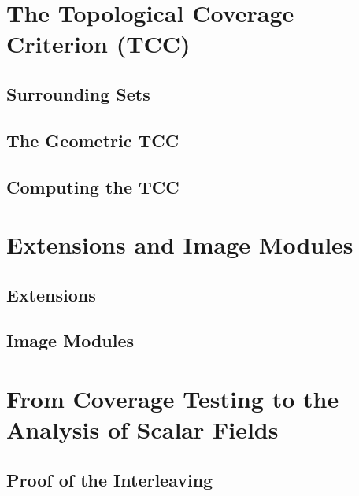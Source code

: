 \documentclass[12pt]{article}
\begin{document}
\clearpage
\section{The Topological Coverage Criterion (TCC)}



\subsection{Surrounding Sets}


\subsection{The Geometric TCC}\label{sec:geometric}


\subsection{Computing the TCC}
  


\clearpage
\section{Extensions and Image Modules}\label{sec:middle}
%


\subsection{Extensions}
  

\subsection{Image Modules}


\clearpage
\section{From Coverage Testing to the Analysis of Scalar Fields}\label{sec:interleaving}





\subsection{Proof of the Interleaving}
  
\end{document}
